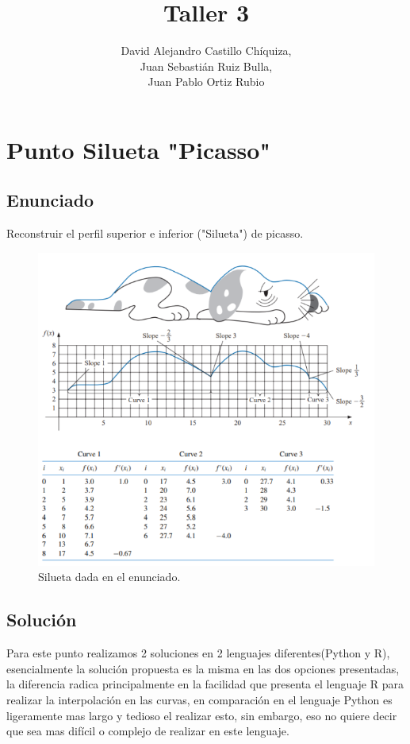 \documentclass[10pt,letterpaper]{article}
\author{David Alejandro Castillo Chíquiza,\\ Juan Sebastián Ruiz Bulla,\\ Juan Pablo Ortiz Rubio}
\title{Taller 3}
\begin{document}
\maketitle

\section{Punto Silueta "Picasso"}

	\subsection{Enunciado}
	Reconstruir el perfil superior e inferior ("Silueta") de picasso.
	\begin{figure}[H]
		\includegraphics[scale=0.5]{EnunciadoSilueta}
		\centering
		\caption{Silueta dada en el enunciado.}
		\centering
	\end{figure}

	\subsection{Solución}
	Para este punto realizamos 2 soluciones en 2 lenguajes diferentes(Python y R), esencialmente la solución propuesta es la misma en las dos opciones presentadas, la diferencia radica principalmente en la facilidad que presenta el lenguaje R para realizar la interpolación en las curvas, en comparación en el lenguaje Python es ligeramente mas largo y tedioso el realizar esto, sin embargo, eso no quiere decir que sea mas difícil o complejo de realizar en este lenguaje.\\
	
\end{document}
